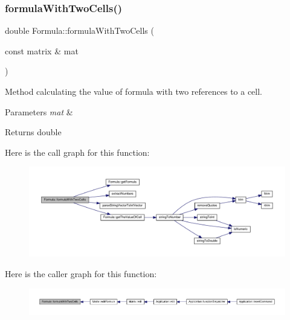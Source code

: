 \subsubsection{\texorpdfstring{formula\+With\+Two\+Cells()}{formulaWithTwoCells()}}
{\footnotesize\ttfamily double Formula\+::formula\+With\+Two\+Cells (\begin{DoxyParamCaption}\item[{const matrix \&}]{mat }\end{DoxyParamCaption})}

Method calculating the value of formula with two references to a cell. 
\begin{DoxyParams}{Parameters}
{\em mat} & \\
\hline
\end{DoxyParams}
\begin{DoxyReturn}{Returns}
double 
\end{DoxyReturn}
Here is the call graph for this function\+:\nopagebreak
\begin{figure}[H]
\begin{center}
\leavevmode
\includegraphics[width=350pt]{class_formula_a518bc97bd50f1cc5573be7d3f8cb6253_cgraph}
\end{center}
\end{figure}
Here is the caller graph for this function\+:\nopagebreak
\begin{figure}[H]
\begin{center}
\leavevmode
\includegraphics[width=350pt]{class_formula_a518bc97bd50f1cc5573be7d3f8cb6253_icgraph}
\end{center}
\end{figure}
\mbox{\label{class_formula_a2159ffdb34d80f2bee422eee89fc871a}} 
